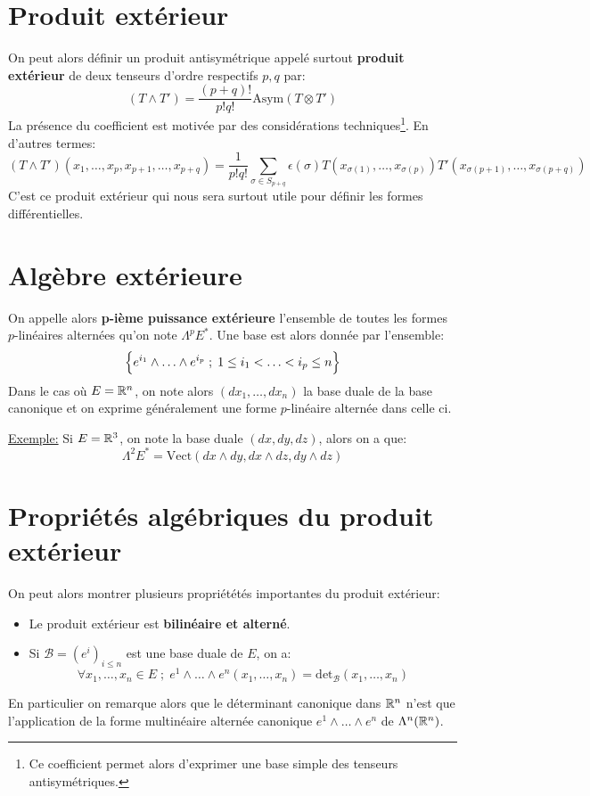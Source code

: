    \section{Produit extérieur}
   On peut alors définir un produit antisymétrique appelé surtout \textbf{produit extérieur} de deux tenseurs d'ordre respectifs \( p, q \) par:
   \[
      (T \wedge T') = \frac{(p+q)!}{p!q!}\text{Asym}(T \otimes T')
   \]
   La présence du coefficient est motivée par des considérations techniques\footnote[1]{Ce coefficient permet alors d'exprimer une base simple des tenseurs antisymétriques.}. En d'autres termes:
   \[
      (T \wedge T')(x_1, \ldots, x_p, x_{p+1}, \ldots, x_{p+q}) =  \frac{1}{p!q!}\sum_{\sigma \in S_{p+q}}\epsilon(\sigma) T(x_{\sigma(1)}, \ldots, x_{\sigma(p)})T'(x_{\sigma(p+1)}, \ldots, x_{\sigma(p+q)})
   \]
   C'est ce produit extérieur qui nous sera surtout utile pour définir les formes différentielles.
   \section{Algèbre extérieure}
   On appelle alors \textbf{p-ième puissance extérieure} l'ensemble de toutes les formes \(p\)-linéaires alternées qu'on note \(\Lambda^p E^*\). Une base est alors donnée par l'ensemble:
   \[
      \Bigl\{ e^{i_1} \wedge \ldots \wedge e^{i_p} \; ; \; 1 \leq i_1 < \ldots < i_p \leq n  \Bigl\}
   \]
   Dans le cas où \( E = \mathbb{R}^n \), on note alors \( (dx_1, \ldots, dx_n) \) la base duale de la base canonique et on exprime généralement une forme \( p \)-linéaire alternée dans celle ci.\<

   \uline{Exemple:} Si \( E = \mathbb{R}^3 \), on note la base duale \((dx, dy, dz)\), alors on a que:
   \[
      \Lambda^2E^* = \text{Vect}(dx \wedge dy, dx \wedge dz, dy \wedge dz)
   \]
   \pagebreak
   \section{Propriétés algébriques du produit extérieur}
   On peut alors montrer plusieurs propriététés importantes du produit extérieur:
   \begin{itemize}
      \item Le produit extérieur est \textbf{bilinéaire et alterné}.
      \item Si \( \mathcal{B} = (e^i)_{i \leq n} \) est une base duale de \( E \), on a:
      \[ 
         \forall x_1, \ldots, x_n \in E \; ; \; e^1 \wedge \ldots \wedge e^n(x_1, \ldots, x_n) = \text{det}_{\mathcal{B}}(x_1, \ldots, x_n)
      \]
   \end{itemize}
   En particulier on remarque alors que le déterminant canonique dans \( \mathbb{R}^n \) n'est que l'application de la forme multinéaire alternée canonique \( e^1 \wedge \ldots \wedge e^n \) de \( \Lambda^n(\mathbb{R}^n) \).

